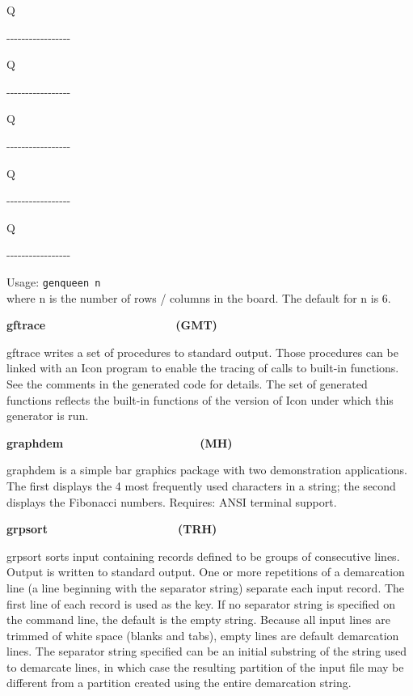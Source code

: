 {\ttfamily
{\textbar} {\textbar} {\textbar}{\textbar} {\textbar} {\textbar}
{\textbar} {\textbar}Q{\textbar}}

{\ttfamily
{}-{}-{}-{}-{}-{}-{}-{}-{}-{}-{}-{}-{}-{}-{}-{}-{}-}

{\ttfamily
{\textbar} {\textbar}Q{\textbar} {\textbar} {\textbar} {\textbar}
{\textbar} {\textbar} {\textbar}}

{\ttfamily
{}-{}-{}-{}-{}-{}-{}-{}-{}-{}-{}-{}-{}-{}-{}-{}-{}-}

{\ttfamily
{\textbar} {\textbar} {\textbar} {\textbar}Q{\textbar} {\textbar}
{\textbar} {\textbar} {\textbar}}

{\ttfamily
{}-{}-{}-{}-{}-{}-{}-{}-{}-{}-{}-{}-{}-{}-{}-{}-{}-}

{\ttfamily
{\textbar} {\textbar} {\textbar} {\textbar} {\textbar}
{\textbar}Q{\textbar} {\textbar} {\textbar}}

{\ttfamily
{}-{}-{}-{}-{}-{}-{}-{}-{}-{}-{}-{}-{}-{}-{}-{}-{}-}

{\ttfamily
{\textbar} {\textbar} {\textbar}Q{\textbar} {\textbar} {\textbar}
{\textbar} {\textbar} {\textbar}}

{\ttfamily
{}-{}-{}-{}-{}-{}-{}-{}-{}-{}-{}-{}-{}-{}-{}-{}-{}-}

Usage: \texttt{genqueen n\\
}where n is the number of rows / columns in the board. The default for n
is 6. 

{\sffamily\bfseries
gftrace\ \ \ \ \ \ \ \ \ \ \ \ \ \ \ \ \ \ \ \ (GMT)}

\textsf{gftrace} writes a set of procedures to standard output. Those
procedures can be linked with an Icon program to enable the
tracing of calls to built-in functions. See the comments
in the generated code for details. The set of generated functions
reflects the built-in functions of the version of Icon under which this
generator is run. 

{\sffamily\bfseries
graphdem\ \ \ \ \ \ \ \ \ \ \ \ \ \ \ \ \ \ \ \  \ (MH)}

\textsf{graphdem} is a simple bar graphics package with two
demonstration applications. The first displays the 4 most frequently
used characters in a string; the second displays the Fibonacci numbers.
Requires: ANSI terminal support.

{\sffamily\bfseries
grpsort\ \ \ \ \ \ \ \ \ \ \ \ \ \ \ \ \ \ \ \ (TRH)}

\textsf{grpsort} sorts input containing
{\textquotedbl}records{\textquotedbl} defined to be groups of
consecutive lines. Output is written to standard output. One or more
repetitions of a demarcation line (a line beginning with the separator
string) separate each input record. The first line of each record is
used as the key. If no separator string is specified on the command
line, the default is the empty string. Because all input lines are
trimmed of white space (blanks and tabs), empty lines are default
demarcation lines. The separator string specified can be an initial
substring of the string used to demarcate lines, in which case the
resulting partition of the input file may be different from a partition
created using the entire demarcation string.

